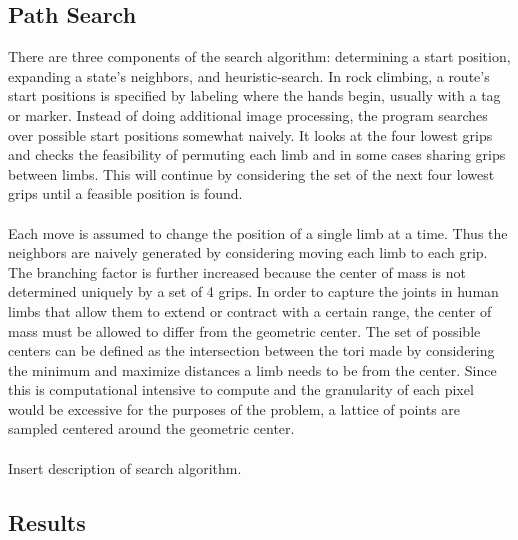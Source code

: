 \documentclass[pdftex,12pt]{article}
\theoremstyle{definition}
\theoremstyle{remark}
\begin{document}
\subsection*{Path Search}
There are three components of the search algorithm: determining a start position, expanding a state's neighbors, and heuristic-search. In rock climbing, a route's start positions is specified by labeling where the hands begin, usually with a tag or marker. Instead of doing additional image processing, the program searches over possible start positions somewhat naively. It looks at the four lowest grips and checks the feasibility of permuting each limb and in some cases sharing grips between limbs. This will continue by considering the set of the next four lowest grips until a feasible position is found.\\ \\
Each move is assumed to change the position of a single limb at a time. Thus the neighbors are naively generated by considering moving each limb to each grip. The branching factor is further increased because the center of mass is not determined uniquely by a set of 4 grips. In order to capture the joints in human limbs that allow them to extend or contract with a certain range, the center of mass must be allowed to differ from the geometric center. The set of possible centers can be defined as the intersection between the tori made by considering the minimum and maximize distances a limb needs to be from the center. Since this is computational intensive to compute and the granularity of each pixel would be excessive for the purposes of the problem, a lattice of points are sampled centered around the geometric center.\\ \\
\text{[}Insert description of search algorithm.\text{]}

\subsection*{Results}
\end{document}
